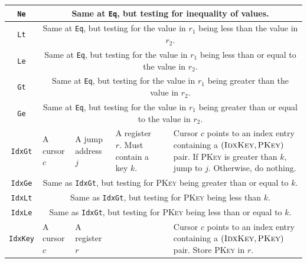 \documentclass[10pt]{article}
\begin{document}
\begin{landscape}
\begin{longtable}{|c|p{3cm}|p{3cm}|p{3cm}|p{3cm}|p{4cm}|}
\texttt{Ne} & 
\multicolumn{5}{c|}{Same at \texttt{Eq}, but testing for inequality of values.} \\\hline

\texttt{Lt} & 
\multicolumn{5}{c|}{Same at \texttt{Eq}, but testing for the value in $r_1$ being less than the value in $r_2$.} \\\hline

\texttt{Le} & 
\multicolumn{5}{c|}{Same at \texttt{Eq}, but testing for the value in $r_1$ being less than or equal to the value in $r_2$.} \\\hline

\texttt{Gt} & 
\multicolumn{5}{c|}{Same at \texttt{Eq}, but testing for the value in $r_1$ being greater than the value in $r_2$.} \\\hline

\texttt{Ge} & 
\multicolumn{5}{c|}{Same at \texttt{Eq}, but testing for the value in $r_1$ being greater than or equal to the value in $r_2$.} \\\hline

%
%

\texttt{IdxGt} & 
A cursor $c$ & 
A jump address $j$ &
A register $r$. Must contain a key $k$. &
\cellcolor[gray]{0.9} &
Cursor $c$ points to an index entry containing a $(\textsc{IdxKey},\textsc{PKey})$ pair. If \textsc{PKey} is greater than $k$, jump to $j$. Otherwise, do nothing.\\\hline

\texttt{IdxGe} & 
\multicolumn{5}{c|}{Same as \texttt{IdxGt}, but testing for \textsc{PKey} being greater than or equal to $k$.} \\\hline

\texttt{IdxLt} & 
\multicolumn{5}{c|}{Same as \texttt{IdxGt}, but testing for \textsc{PKey} being less than $k$.} \\\hline

\texttt{IdxLe} & 
\multicolumn{5}{c|}{Same as \texttt{IdxGt}, but testing for \textsc{PKey} being less than or equal to $k$.} \\\hline

\texttt{IdxKey} & 
A cursor $c$ & 
A register $r$ &
\cellcolor[gray]{0.9} &
\cellcolor[gray]{0.9} &
Cursor $c$ points to an index entry containing a $(\textsc{IdxKey},\textsc{PKey})$ pair. Store \textsc{PKey} in $r$.\\\hline


\end{longtable}
\end{landscape}
\end{document}

